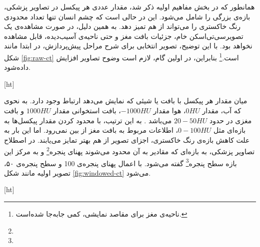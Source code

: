 همانطور که در بخش مفاهیم اولیه ذکر شد، مقدار عددی هر پیکسل در تصاویر پزشکی، بازه‌ی بزرگی را شامل می‌شود.
این در حالی است که چشم انسان تنها تعداد محدودی رنگ خاکستری را می‌تواند از هم تمیز دهد.
به همین دلیل، در صورت مشاهده‌ی یک تصویرسی‌تی‌اسکن خام، جزئیات بافت مغز و حتی ناحیه‌ی آسیب‌دیده، قابل مشاهده نخواهد بود. 
با این توضیح، تصویر انتخابی برای شرح مراحل پیش‌پردازش، در ابتدا مانند 
شکل \ref{fig:raw-ct} است.\footnote{ناحیه‌ی مغز برای مقاصد نمایشی، کمی جا‌به‌جا شده‌است.}
بنابراین، در اولین گام، لازم است وضوح تصاویر افزایش داده‌شود.


[ht]

 میان مقدار هر پیکسل با بافت یا شیئی که نمایش می‌دهد ارتباط وجود دارد.
به نحوی که آب، مقدار $0 HU$، هوا مقدار $-1000 HU$، بافت استخوانی مقدار $1000 HU$ و بافت مغزی در حدود $20-50 HU$ می‌باشد \cite{kamalian2016computed}.
به این ترتیب، با محدود کردن مقدار پیکسل‌ها به بازه‌ای مثل $0-100 HU$، اطلاعات مربوط به بافت مغز از بین نمی‌رود.
اما این بار به علت کاهش بازه‌ی رنگ خاکستری، اجزای تصویر از هم بهتر تمایز می‌یابند.
در اصطلاح تصاویر پزشکی، به بازه‌ای که مقادیر به آن محدود می‌شوند 
پهنای پنجره\footnote{}
و به مرکز این بازه
 سطح پنجره\footnote{} گفته می‌شود.
با اعمال پهنای پنجره‌ی 100 و سطح پنجره‌ی ۵۰، تصویر اولیه مانند شکل 
\ref{fig:windowed-ct}
می‌شود.


[ht]


